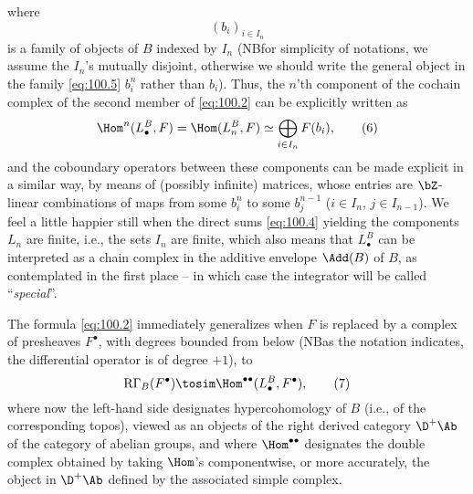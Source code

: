 where
\begin{equation}
  \label{eq:100.5}
  (b_i)_{i\in I_n} \tag{5}
\end{equation}
is a family of objects of $B$ indexed by $I_n$ (NB\enspace for
simplicity of notations, we assume the $I_n$'s mutually disjoint,
otherwise we should write the general object in the family
\eqref{eq:100.5} $b_i^n$ rather than $b_i$). Thus, the $n$'th
component of the cochain complex of the second member of
\eqref{eq:100.2} can be explicitly written as
\begin{equation}
  \label{eq:100.6}
  \Hom^n(L_\bullet^B,F) = \Hom(L_n^B,F) \simeq \bigoplus_{i\in I_n} F(b_i),\tag{6}
\end{equation}
and the coboundary operators between these components can be made
explicit in a similar way, by means of (possibly infinite) matrices,
whose entries are $\bZ$-linear combinations of maps from some $b_i^n$
to some $b_j^{n-1}$ ($i\in I_n$, $j\in I_{n-1}$). We feel a little
happier still when the direct sums \eqref{eq:100.4} yielding the
components $L_n$ are finite, i.e., the sets $I_n$ are finite, which
also means that $L_\bullet^B$ can be interpreted as a chain complex in
the additive envelope $\Add(B)$ of $B$, as contemplated in the first
place -- in which case the integrator will be called
``\emph{special}''.

The formula \eqref{eq:100.2} immediately generalizes when $F$ is
replaced by a complex of presheaves $F^\bullet$, with degrees bounded
from below (NB\enspace as the notation indicates, the differential
operator is of degree $+1$), to
\begin{equation}
  \label{eq:100.7}
  \mathrm R\Gamma_B(F^\bullet) \tosim \Hom^{\bullet\bullet}(L_\bullet^B,F^\bullet),\tag{7}
\end{equation}
where now the left-hand side designates hypercohomology of $B$ (i.e.,
of the corresponding topos), viewed as an objects of the right derived
category $\D^+\Ab$ of the category of abelian groups, and where
$\Hom^{\bullet\bullet}$ designates the double complex obtained by
taking $\Hom$'s componentwise, or more accurately, the object in
$\D^+\Ab$ defined by the associated simple complex.

